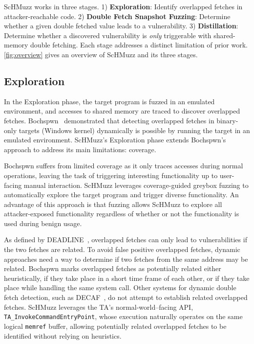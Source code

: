 \documentclass[letterpaper,twocolumn,10pt]{article}
\newcommand{\sysname}{ScHMuzz\xspace}
\newcommand{\stageone}{Exploration\xspace}
\newcommand{\stagetwo}{Double Fetch Snapshot Fuzzing\xspace}
\newcommand{\stagethree}{Distillation\xspace}
\begin{document}
\sysname works in three stages.
1) \textbf{\stageone}: Identify overlapped fetches in attacker-reachable code. 2) \textbf{\stagetwo}: Determine 
whether a given double fetched value leads to a vulnerability. 3) \textbf{\stagethree}: Determine whether 
a discovered vulnerability is \emph{only} triggerable with shared-memory double fetching.
Each stage addresses a distinct limitation of prior work. \autoref{fig:overview} gives an overview of \sysname 
and its three stages.

\subsection{\stageone}

In the \stageone phase, the target program is fuzzed in an emulated environment, 
and accesses to shared memory are traced to discover overlapped fetches. Bochspwn~\cite{bochspwn} 
demonstrated that detecting overlapped fetches in binary-only targets (Windows kernel) dynamically 
is possible by running the target in an emulated environment. 
\sysname's \stageone phase extends Bochspwn's approach to address its main limitations: coverage.

Bochspwn suffers from limited coverage as it only traces accesses during normal operations, 
leaving the task of triggering interesting functionality up to user-facing manual interaction.
\sysname leverages coverage-guided greybox fuzzing to automatically explore the target program 
and trigger diverse functionality. An advantage of this approach is that fuzzing allows \sysname 
to explore all attacker-exposed functionality regardless of whether or not the functionality is 
used during benign usage. 

As defined by DEADLINE~\cite{deadline}, overlapped fetches can only lead to vulnerabilities if 
the two fetches are related. To avoid false positive overlapped fetches, dynamic approaches need 
a way to determine if two fetches from the same address may be related.
Bochspwn marks overlapped fetches as potentially related either heuristically, if they take place in a short 
time frame of each other, or if they take place while handling the same system call. 
Other systems for dynamic double fetch detection, such as DECAF~\cite{decaf}, do not attempt to establish related overlapped fetches.
\sysname leverages the TA’s normal-world–facing API, \texttt{TA\_InvokeCommandEntryPoint}, 
whose execution naturally operates on the same logical \texttt{memref} buffer, allowing potentially 
related overlapped fetches to be identified without relying on heuristics.
\end{document}
